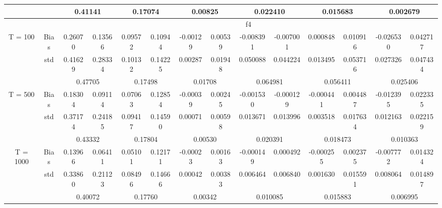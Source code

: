 \documentclass[a4paper,12pt,times,numbered,print,index]{report}
\numberwithin{equation}{section}
\begin{document}
\begin{table}[htbp]
\begin{adjustbox}{max width=\textwidth}
\begin{tabular}{cccccccccccccc}
		&       & \multicolumn{2}{c}{0.41141} & \multicolumn{2}{c}{0.17074} & \multicolumn{2}{c}{0.00825} & \multicolumn{2}{c}{0.022410} & \multicolumn{2}{c}{0.015683} & \multicolumn{2}{c}{0.002679} \\
		\midrule
		&       & \multicolumn{12}{c}{f4} \\
		\midrule
		\multirow{3}[1]{*}{T = 100} & Bias  & 0.26070 & 0.13566 & 0.09572 & 0.10944 & -0.00129 & 0.00539 & -0.008391 & -0.007001 & 0.000848 & \textcolor[rgb]{ .329,  .51,  .208}{0.010916} & -0.026530 & 0.042717 \\
		& std   & 0.41629 & 0.28334 & 0.10132 & 0.14225 & 0.00287 & 0.01948 & 0.050088 & 0.044224 & 0.013495 & 0.053716 & 0.027326 & 0.047434 \\
		&       & \multicolumn{2}{c}{0.47705} & \multicolumn{2}{c}{0.17498} & \multicolumn{2}{c}{0.01708} & \multicolumn{2}{c}{0.064981} & \multicolumn{2}{c}{0.056411} & \multicolumn{2}{c}{0.025406} \\
		\multirow{3}[0]{*}{T = 500} & Bias  & 0.18304 & 0.09114 & 0.07063 & 0.12854 & -0.00039 & 0.00245 & -0.001530 & -0.000129 & -0.000441 & \textcolor[rgb]{ .329,  .51,  .208}{0.004487} & -0.012395 & 0.022335 \\
		& std   & 0.37174 & 0.24185 & 0.09417 & 0.14590 & 0.00071 & 0.00598 & 0.013671 & 0.013996 & 0.003518 & 0.017634 & 0.012163 & 0.022159 \\
		&       & \multicolumn{2}{c}{0.43332} & \multicolumn{2}{c}{0.17804} & \multicolumn{2}{c}{0.00530} & \multicolumn{2}{c}{0.020391} & \multicolumn{2}{c}{0.018473} & \multicolumn{2}{c}{0.010363} \\
		\multirow{3}[1]{*}{T = 1000} & Bias  & 0.13966 & 0.06411 & 0.05101 & 0.12171 & -0.00023 & 0.00163 & -0.000149 & 0.000492 & -0.000255 & \textcolor[rgb]{ .329,  .51,  .208}{0.002375} & -0.007772 & 0.014324 \\
		& std   & 0.33860 & 0.21123 & 0.08496 & 0.14666 & 0.00042 & 0.00383 & 0.006464 & 0.006840 & 0.001630 & 0.015591 & 0.008064 & 0.014897 \\
		&       & \multicolumn{2}{c}{0.40072} & \multicolumn{2}{c}{0.17760} & \multicolumn{2}{c}{0.00342} & \multicolumn{2}{c}{0.010085} & \multicolumn{2}{c}{0.015883} & \multicolumn{2}{c}{0.006995} \\
		\bottomrule
		\bottomrule
    	\end{tabular}%
\end{adjustbox}
\label{nonco-f12}%
\end{table}%
\end{document}
